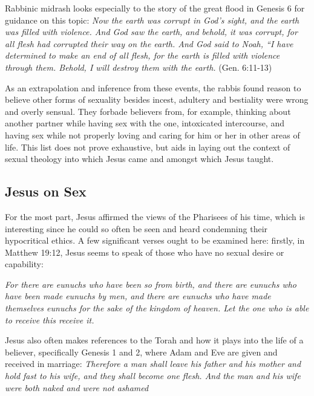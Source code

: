 \documentclass[12pt]{article}
\begin{document}
    \par
        Rabbinic midrash looks especially to the story of the great flood
        in Genesis 6 for guidance on this topic\cite{berk2002}:
        \textit{Now the earth was corrupt in God's sight, and the earth
        was filled with violence. And God saw the earth, and behold,
        it was corrupt, for all flesh had corrupted their way on the earth.
        And God said to Noah, “I have determined to make an end of
        all flesh, for the earth is filled with violence through them.
        Behold, I will destroy them with the earth.} (Gen. 6:11-13\cite{esv2016})

    \par
        As an extrapolation and inference from these events, the rabbis 
        found reason to believe other forms of sexuality besides incest,
        adultery and bestiality were wrong and overly sensual. They forbade
        believers from, for example, thinking about another partner while
        having sex with the one, intoxicated intercourse, and having sex
        while not properly loving and caring for him or her in other areas
        of life\cite{berk2002}. This list does not prove exhaustive, but aids 
        in laying out the context of sexual theology into which Jesus came
        and amongst which Jesus taught.

\subsection{Jesus on Sex}

    \par For the most part, Jesus affirmed the views of the Pharisees of
        his time, which is interesting since he could so often be seen
        and heard condemning their hypocritical ethics. A few significant
        verses ought to be examined here: firstly, in Matthew 19:12,
        Jesus seems to speak of those who have no sexual desire or
        capability:

    \par \textit{For there are eunuchs who have been so from birth, and there are eunuchs who have been made eunuchs by men, and there are eunuchs who have made themselves eunuchs for the sake of the kingdom of heaven. Let the one who is able to receive this receive it.}

    \par Jesus also often makes references to the Torah and how it plays into
        the life of a believer, specifically Genesis 1 and 2, where Adam and Eve
        are given and received in marriage: \textit{Therefore a man shall leave his father and his mother and hold fast to his wife, and they shall become one flesh. And the man and his wife were both naked and were not ashamed}
\end{document}
